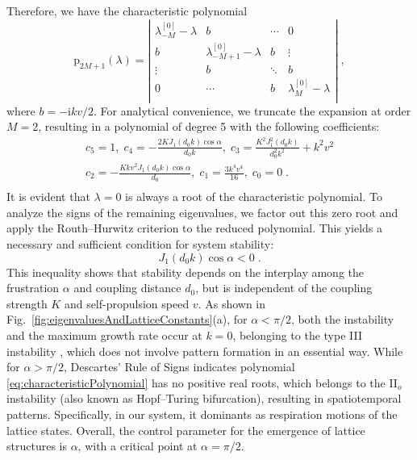 \documentclass{article}
\begin{document}
Therefore, we have the characteristic polynomial
\begin{equation}
        \mathrm{p}_{2M+1}\left( \lambda \right) =\left| \begin{matrix}
        \lambda _{-M}^{\left[ 0 \right]}-\lambda&		b&		\cdots&		0\\
        b&		\lambda _{-M+1}^{\left[ 0 \right]}-\lambda&		b&		\vdots\\
        \vdots&		b&		\ddots&		b\\
        0&		\cdots&		b&		\lambda _{M}^{\left[ 0 \right]}-\lambda\\
    \end{matrix} \right|\;,
    \label{eq:characteristicPolynomial}
\end{equation}
where $b=-\mathrm{i}kv/2$. For analytical convenience, we truncate the expansion at order $M=2$, resulting in a polynomial of degree 5 with the following coefficients:
\begin{equation}
    \begin{array}{c}
	c_5=1,\;c_4=-\frac{2KJ_1\left( d_0k \right) \cos \alpha}{d_0k},\;c_3=\frac{K^2J_{1}^{2}\left( d_0k \right)}{d_{0}^{2}k^2}+k^2v^2\\
	c_2=-\frac{Kkv^2J_1\left( d_0k \right) \cos \alpha}{d_0},\;c_1=\frac{3k^4v^4}{16},\;c_0=0\;.\\
\end{array}
\end{equation}
It is evident that $\lambda =0$ is always a root of the characteristic polynomial. To analyze the signs of the remaining eigenvalues, we factor out this zero root and apply the Routh–Hurwitz criterion to the reduced polynomial. This yields a necessary and sufficient condition for system stability:
\begin{equation}
    J_1\left( d_0k \right) \cos \alpha <0\;.
\end{equation}
This inequality shows that stability depends on the interplay among the frustration $\alpha$ and coupling distance $d_0$, but is independent of the coupling strength $K$ and self-propulsion speed $v$. 
As shown in Fig.~\ref{fig:eigenvaluesAndLatticeConstants}(a), for $\alpha < \pi/2$, both the instability and the maximum growth rate occur at $k=0$, belonging to the type III instability \cite{RevModPhys.65.851}, which does not involve pattern formation in an essential way. While for $\alpha > \pi/2$, Descartes' Rule of Signs indicates polynomial \eqref{eq:characteristicPolynomial} has no positive real roots, which belongs to the II$_o$ instability (also known as Hopf–Turing bifurcation), resulting in spatiotemporal patterns. Specifically, in our system, it dominants as respiration motions of the lattice states. Overall, the control parameter for the emergence of lattice structures is $\alpha$, with a critical point at $\alpha = \pi/2$.
\end{document}
